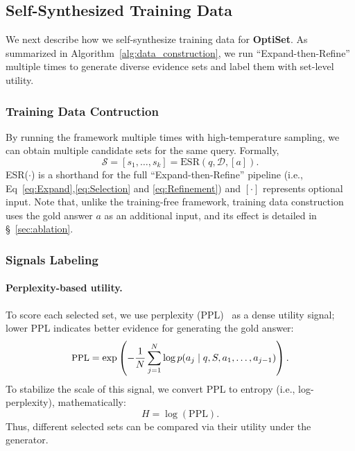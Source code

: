 \documentclass[11pt]{article}
\begin{document}
\subsection{Self-Synthesized Training Data}
We next describe how we self-synthesize training data for \textbf{OptiSet}. 
As summarized in Algorithm~\ref{alg:data_construction}, we run ``Expand-then-Refine'' multiple times to generate diverse evidence sets and label them with set-level utility. 

\subsubsection{Training Data Contruction}
By running the framework multiple times with high-temperature sampling, we can obtain multiple candidate sets for the same query. Formally,
\begin{equation}
    \mathcal{S} = [s_1, \dots,s_k] = \text{ESR}(q, \mathcal{D},[a]).
\end{equation} 
ESR($\cdot$) is a shorthand for the full ``Expand-then-Refine'' pipeline (i.e., Eq~\ref{eq:Expand},\ref{eq:Selection} and \ref{eq:Refinement}) and $[\cdot]$ represents optional input. 
Note that, unlike the training-free framework, training data construction uses the gold answer $a$ as an additional input, and its effect is detailed in \S~\ref{sec:ablation}. 


\subsubsection{Signals Labeling}

\paragraph{Perplexity-based utility.}
To score each selected set, we use perplexity (PPL)~\citep{li2024quantity} as a dense utility signal; lower PPL indicates better evidence for generating the gold answer: 
\begin{equation}
\small{
    \text{PPL} = \exp\left(-\frac{1}{N} \sum_{j=1}^N \log p(a_{j} \mid q, S, a_{1}, \dots, a_{j-1})\right).
}
\end{equation}
To stabilize the scale of this signal, we convert PPL to entropy (i.e., log-perplexity), mathematically:
\begin{equation}
    H = \log(\text{PPL}).
\end{equation}
Thus, different selected sets can be compared via their utility under the generator. 
\end{document}
